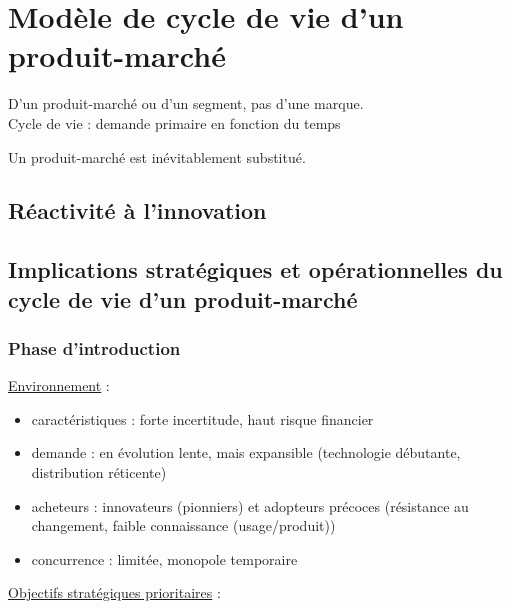 		
	\section{Modèle de cycle de vie d'un produit-marché}
		
	D'un produit-marché ou d'un segment, pas d'une marque. \\
	
	Cycle de vie : demande primaire en fonction du temps
	
	
	Un produit-marché est inévitablement substitué.
	
		\subsection{Réactivité à l'innovation}
		
		
		
		
		
		\subsection{Implications stratégiques et opérationnelles du cycle de vie d'un produit-marché}
		
			\subsubsection{Phase d'introduction}		
		
			\underline{Environnement} :
		
			\begin{itemize}
				\item caractéristiques : forte incertitude, haut risque financier
				\item demande : en évolution lente, mais expansible (technologie débutante, distribution réticente)
				\item acheteurs : innovateurs (pionniers) et adopteurs précoces (résistance au changement, faible connaissance (usage/produit))
				\item concurrence : limitée, monopole temporaire
			\end{itemize}
			\n
			\underline{Objectifs stratégiques prioritaires} :
			
